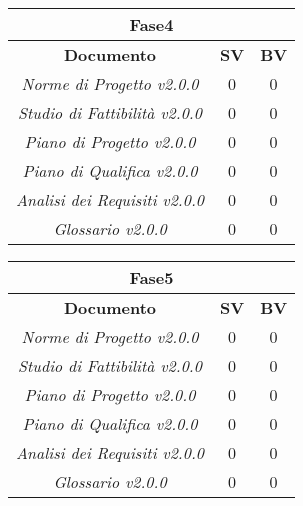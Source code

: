 \vspace{3mm}
\begin{center}
\begin{tabular}{|c|c|c|}
\toprule
\multicolumn{3}{c}{\textbf{Fase4}} \\
\hline
\textbf{Documento} & \textbf{SV} & \textbf{BV} \\ 
\hline
\textit{Norme di Progetto v2.0.0} & 0 & 0 \\ 
\textit{Studio di Fattibilità v2.0.0} & 0 & 0 \\ 
\textit{Piano di Progetto v2.0.0} & 0 & 0 \\ 
\textit{Piano di Qualifica v2.0.0} & 0 & 0 \\ 
\textit{Analisi dei Requisiti v2.0.0} & 0 & 0 \\ 
\textit{Glossario v2.0.0} & 0 & 0 \\ 
\hline
\end{tabular}
\end{center}
\vspace{3mm}
\begin{center}
\begin{tabular}{|c|c|c|}
\toprule
\multicolumn{3}{c}{\textbf{Fase5}} \\
\hline
\textbf{Documento} & \textbf{SV} & \textbf{BV} \\ 
\hline
\textit{Norme di Progetto v2.0.0} & 0 & 0 \\ 
\textit{Studio di Fattibilità v2.0.0} & 0 & 0 \\ 
\textit{Piano di Progetto v2.0.0} & 0 & 0 \\ 
\textit{Piano di Qualifica v2.0.0} & 0 & 0 \\ 
\textit{Analisi dei Requisiti v2.0.0} & 0 & 0 \\ 
\textit{Glossario v2.0.0} & 0 & 0 \\ 
\hline
\end{tabular}

\end{center}